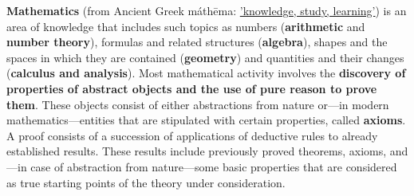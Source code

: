 \def\ind{\quad}
\textbf{Mathematics} (from Ancient Greek máthēma: \underline{'knowledge, study, learning'}) is an area of knowledge 
that includes such topics as numbers (\textbf{arithmetic} and \textbf{number theory}), formulas and related structures (\textbf{algebra}), shapes and the spaces in which they are contained (\textbf{geometry}) and quantities and their changes (\textbf{calculus and analysis}).
\endgraf
\def\ind{\quad}
Most mathematical activity involves the \textbf{discovery of properties of abstract objects and the use of pure reason to prove them}. These objects consist of either abstractions from nature or—in modern mathematics—entities that are stipulated with certain properties, called \textbf{axioms}. A proof consists of a succession of applications of deductive rules to already established results. These results include previously proved theorems, axioms, and—in case of abstraction from nature—some basic properties that are considered as true starting points of the theory under consideration.